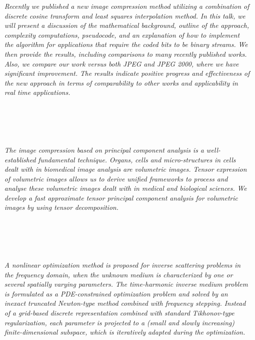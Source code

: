   \begin{multicols}{2}
      \textit{Recently we published a new image compression method utilizing a combination of discrete cosine transform and least squares interpolation method. In this talk, we will present a discussion of the mathematical background, outline of the approach, complexity computations, pseudocode, and an explanation of how to implement the algorithm for applications that require the coded bits to be binary streams. We then provide the results, including comparisons to many recently published works. Also, we compare our work versus both JPEG and JPEG 2000, where we have significant improvement. The results indicate positive progress and effectiveness of the new approach in terms of comparability to other works and applicability in real time applications.}\\
\\ 
        \\
        \\\\
\\
      \textit{The image compression based on principal component analysis  is a well-established fundamental technique. 
Organs, cells and micro-structures in cells dealt with in biomedical image analysis are volumetric images. 
Tensor expression of volumetric images allows us to derive unified frameworks to process and analyse 
these volumetric images dealt with in medical and biological sciences.  
We develop a fast approximate tensor principal component analysis 
for volumetric images by using tensor decomposition. }\\
\\ 
        \\
        \\\\
\\
      \textit{A nonlinear optimization method is proposed for inverse scattering problems in
the frequency domain, when the unknown medium is characterized by one or several
spatially varying parameters. The time-harmonic inverse medium problem is formulated 
as a PDE-constrained optimization problem and solved by an inexact truncated
Newton-type method combined with frequency stepping. Instead of a grid-based 
discrete representation combined with standard Tikhonov-type regularization, 
each parameter is projected to a (small and slowly increasing) finite-dimensional
subspace, which is iteratively adapted during the optimization. }\\

\end{multicols}
